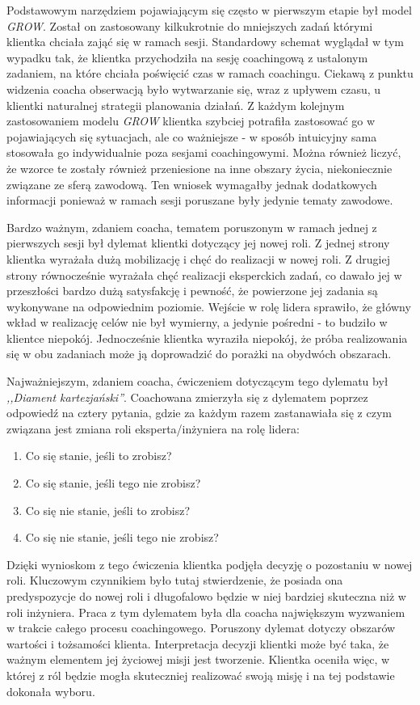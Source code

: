 Podstawowym narzędziem pojawiającym się często w pierwszym etapie był model \emph{GROW}. Został on zastosowany kilkukrotnie do mniejszych zadań
którymi klientka chciała zająć się w ramach sesji. Standardowy schemat wyglądał w tym wypadku tak, że klientka przychodziła na sesję coachingową
z ustalonym zadaniem, na które chciała poświęcić czas w ramach coachingu. Ciekawą z punktu widzenia coacha obserwacją było wytwarzanie się, wraz z upływem
czasu, u klientki naturalnej strategii planowania działań. Z każdym kolejnym zastosowaniem modelu \emph{GROW} klientka szybciej potrafiła zastosować
go w pojawiających się sytuacjach, ale co ważniejsze - w sposób intuicyjny sama stosowała go indywidualnie poza sesjami coachingowymi. Można również liczyć,
że wzorce te zostały również przeniesione na inne obszary życia, niekoniecznie związane ze sferą zawodową. Ten wniosek wymagałby jednak dodatkowych
informacji ponieważ w ramach sesji poruszane były jedynie tematy zawodowe.

Bardzo ważnym, zdaniem coacha, tematem poruszonym w ramach jednej z pierwszych sesji był dylemat klientki dotyczący jej nowej roli.
Z jednej strony klientka wyrażała dużą mobilizację i chęć do realizacji w nowej roli. Z drugiej strony równocześnie wyrażała chęć realizacji
eksperckich zadań, co dawało jej w przeszłości bardzo dużą satysfakcję i pewność, że powierzone jej zadania są wykonywane na odpowiednim poziomie.
Wejście w rolę lidera sprawiło, że główny wkład w realizację celów nie był wymierny, a jedynie pośredni - to budziło w klientce niepokój.
Jednocześnie klientka wyraziła niepokój, że próba realizowania się w obu zadaniach może ją doprowadzić do porażki na obydwóch obszarach.

Najważniejszym, zdaniem coacha, ćwiczeniem dotyczącym tego dylematu był \emph{,,Diament kartezjański''}.
Coachowana zmierzyła się z dylematem poprzez odpowiedź na cztery pytania, gdzie za każdym razem zastanawiała się z czym związana jest zmiana
roli eksperta/inżyniera na rolę lidera:
\begin{enumerate}
\item Co się stanie, jeśli to zrobisz?
\item Co się stanie, jeśli tego nie zrobisz?
\item Co się nie stanie, jeśli to zrobisz?
\item Co się nie stanie, jeśli tego nie zrobisz?
\end{enumerate}
Dzięki wynioskom z tego ćwiczenia klientka podjęła decyzję o pozostaniu w nowej roli. Kluczowym czynnikiem było tutaj stwierdzenie, że posiada
ona predyspozycje do nowej roli i długofalowo będzie w niej bardziej skuteczna niż w roli inżyniera. Praca z tym dylematem była dla coacha
największym wyzwaniem w trakcie całego procesu coachingowego. Poruszony dylemat dotyczy obszarów wartości i tożsamości klienta. Interpretacja
decyzji klientki może być taka, że ważnym elementem jej życiowej misji jest tworzenie. Klientka oceniła więc, w której z ról będzie mogła skuteczniej
realizować swoją misję i na tej podstawie dokonała wyboru.

